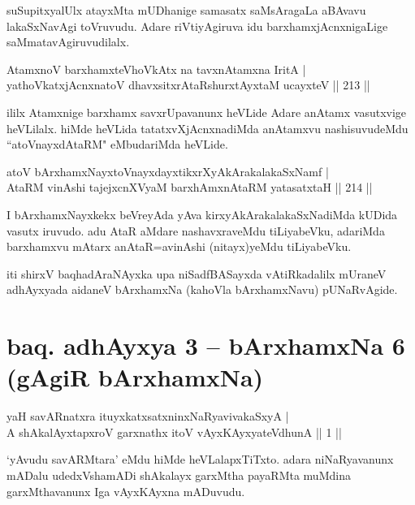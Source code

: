 \begin{artha}
suSupitxyalUlx atayxMta mUDhanige samasatx saMsAragaLa aBAvavu lakaSxNavAgi toVruvudu. Adare riVtiyAgiruva idu barxhamxjAcnxnigaLige saMmatavAgiruvudilalx.
\end{artha}


\begin{shl}
AtamxnoV barxhamxteVhoVkAtx na tavxnAtamxna IritA |\\
yathoVkatxjAcnxnatoV dhavxsitxrAtaRshurxtAyx\s taM ucayxteV \hfill || 213 ||
\end{shl}

\begin{artha}
ililx Atamxnige barxhamx savxrUpavanunx heVLide Adare anAtamx vasutxvige heVLilalx. hiMde heVLida tatatxvXjAcnxnadiMda anAtamxvu nashisuvudeMdu ``atoV\s nayxdAtaRM" eMbudariMda heVLide.
\end{artha}

\begin{shl}
atoV bArxhamxNayxtoV\s nayxdayxtikxrXyAkArakalakaSxNamf |\\
AtaRM vinAshi tajejxcnXVyaM barxhAmxnAtaRM yatasatxtaH \hfill || 214 ||
\end{shl}

\begin{artha}
I bArxhamxNayxkekx beVreyAda yAva kirxyAkArakalakaSxNadiMda kUDida vasutx iruvudo. adu AtaR aMdare nashavxraveMdu tiLiyabeVku, adariMda barxhamxvu mAtarx anAtaR=avinAshi (nitayx)yeMdu tiLiyabeVku. 
\end{artha}

\begin{center}
iti shirxV baqhadAraNAyxka upa niSadfBASayxda vAtiRkadalilx mUraneV adhAyxyada aidaneV bArxhamxNa (kahoVla bArxhamxNavu) pUNaRvAgide.
\end{center}

\section*{baq. adhAyxya 3 -- bArxhamxNa 6 (gAgiR bArxhamxNa)}%

\begin{shl}
yaH savARnatxra ituyxkatxsatxninxNaRyavivakaSxyA |\\
A shAkalAyxtapxroV garxnathx itoV vAyxKAyxyateV\s dhunA \hfill || 1 ||
\end{shl}

\begin{artha}
`yAvudu savARMtara' eMdu hiMde heVLalapxTiTxto. adara niNaRyavanunx mADalu udedxVshamADi shAkalayx garxMtha payaRMta muMdina garxMthavanunx Iga vAyxKAyxna mADuvudu.
\end{artha}

